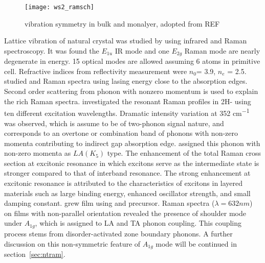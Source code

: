 \begin{figure}[htb]
\centering
\texttt{[image: ws2\_ramsch]}
\caption[ vibration symmetry]{ vibration symmetry in bulk and monalyer, adopted from REF\cite{Ghorbani-asl}}
\label{fig:ws2ramsch}
\end{figure}

Lattice vibration of natural  crystal was studied by \citeauthor{Wieting1971} using infrared and Raman spectroscopy.\cite{Wieting1971} It was found the $E_{1u}$ IR mode and one $E_{2g}$ Raman mode are nearly degenerate in energy. 15 optical modes are allowed assuming 6 atoms in primitive cell. Refractive indices from reflectivity measurement were $n_0$= 3.9, $n_e$ = 2.5. \citeauthor{Stacy1985} studied  and  Raman spectra using lasing energy close to the absorption edges.\cite{Stacy1985} Second order scattering from phonon with nonzero momentum is used to explain the rich Raman spectra. \citeauthor{Sourisseau1991} investigated the resonant Raman profiles in 2H- using ten different excitation wavelengths.\cite{Sourisseau1991} Dramatic intensity variation at 352 \si{cm^{-1}} was observed, which is assume to be of two-phonon signal nature, and corresponds to an overtone or combination band of phonons with non-zero momenta contributing to indirect gap absorption edge. \citeauthor{Sourisseau1991} assigned this phonon with non-zero momenta as $LA(K_5)$ type. The enhancement of the total Raman cross section at excitonic resonance in which excitons serve as the intermediate state is stronger compared to that of interband resonance. The strong enhancement at excitonic resonance is attributed to the characteristics of excitons in layered materials such as large binding energy, enhanced oscillator strength, and small damping constant.\cite{Zhao2013} \citeauthor{Chung1998} grew  film using  and  precursor.\cite{Chung1998} Raman spectra ($\lambda=632nm$) on films with non-parallel orientation revealed the presence of shoulder mode under $A_{1g}$, which is assigned to LA and TA phonon coupling. This coupling process stems from disorder-activated zone boundary phonons. A further discussion on this non-symmetric feature of $A_{1g}$ mode will be continued in section~\ref{sec:ntram}.

